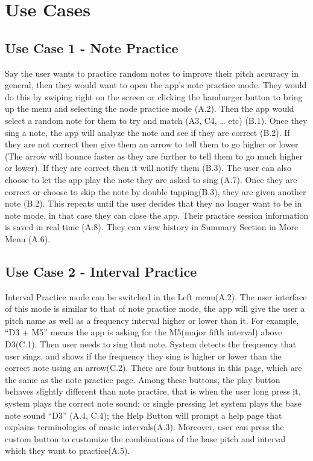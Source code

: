 \documentclass{article}
\begin{document}
\section{Use Cases}
\subsection{Use Case 1 - Note Practice}
Say the user wants to practice random notes to improve their pitch accuracy in general, then they would want to open the app’s note practice mode. They would do this by swiping right on the screen or clicking the hamburger button to bring up the menu and selecting the node practice mode (A.2). Then the app would select a random note for them to try and match (A3, C4, … etc) (B.1). Once they sing a note, the app will analyze the note and see if they are correct (B.2). If they are not correct then give them an arrow to tell them to go higher or lower (The arrow will bounce faster as they are further to tell them to go much higher or lower). If they are correct then it will notify them (B.3). The user can also choose to let the app play the note they are asked to sing (A.7). Once they are correct or choose to skip the note by double tapping(B.3), they are given another note (B.2). This repeats until the user decides that they no longer want to be in note mode, in that case they can close the app. Their practice session information is saved in real time (A.8). They can view history in Summary Section in More Menu (A.6).

\subsection{Use Case 2 - Interval Practice}
Interval Practice mode can be switched in the Left menu(A.2). The user interface of this mode is similar to that of note practice mode, the app will give the user a pitch name as well as a frequency interval higher or lower than it. For example, “D3 + M5” means the app is asking for the M5(major fifth interval) above D3(C.1). Then user needs to sing that note. System detects the frequency that user sings, and shows if the frequency they sing is higher or lower than the correct note using an arrow(C.2). There are four buttons in this page, which are the same as the note practice page.  Among these buttons, the play button behaves slightly different than note practice, that is when the user long press it, system plays the correct note sound; or single pressing let system plays the base note sound “D3” (A.4, C.4); the Help Button will prompt a help page that explains terminologies of music intervals(A.3). Moreover, user can press the custom button to customize the combinations of the base pitch and interval which they want to practice(A.5). 
\end{document}
